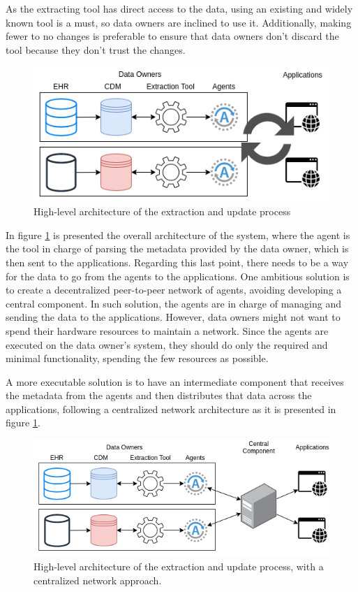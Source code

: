 As the extracting tool has direct access to the data, using an existing and widely known tool is a must, so data owners are inclined to use it.
Additionally, making fewer to no changes is preferable to ensure that data owners don't discard the tool because they don't trust the changes.

\begin{figure}[H]
    \center
    \includegraphics[width=.6\textwidth]{overall-arch-v2}
    \caption{High-level architecture of the extraction and update process}
    \label{fig:overall-arch-v2}
\end{figure}

In figure \ref{fig:overall-arch-v2} is presented the overall architecture of the system, where the agent is the tool in charge of parsing the metadata provided by the data owner, which is then sent to the applications.
Regarding this last point, there needs to be a way for the data to go from the agents to the applications.
One ambitious solution is to create a decentralized peer-to-peer network of agents, avoiding developing a central component.
In such solution, the agents are in charge of managing and sending the data to the applications.
However, data owners might not want to spend their hardware resources to maintain a network.
Since the agents are executed on the data owner's system, they should do only the required and minimal functionality, spending the few resources as possible.

A more executable solution is to have an intermediate component that receives the metadata from the agents and then distributes that data across the applications, following a centralized network architecture as it is presented in figure \ref{fig:overall-arch-v2}.

\begin{figure}[H]
    \center
    \includegraphics[width=.6\textwidth]{overall-arch-v3}
    \caption{High-level architecture of the extraction and update process, with a centralized network approach.}
    \label{fig:overall-arch-v3}
\end{figure}

